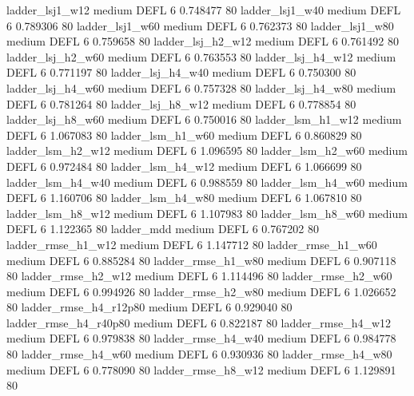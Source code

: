        ladder_lsj1_w12     medium     DEFL                 6 0.748477 80
       ladder_lsj1_w40     medium     DEFL                 6 0.789306 80
       ladder_lsj1_w60     medium     DEFL                 6 0.762373 80
       ladder_lsj1_w80     medium     DEFL                 6 0.759658 80
     ladder_lsj_h2_w12     medium     DEFL                 6 0.761492 80
     ladder_lsj_h2_w60     medium     DEFL                 6 0.763553 80
     ladder_lsj_h4_w12     medium     DEFL                 6 0.771197 80
     ladder_lsj_h4_w40     medium     DEFL                 6 0.750300 80
     ladder_lsj_h4_w60     medium     DEFL                 6 0.757328 80
     ladder_lsj_h4_w80     medium     DEFL                 6 0.781264 80
     ladder_lsj_h8_w12     medium     DEFL                 6 0.778854 80
     ladder_lsj_h8_w60     medium     DEFL                 6 0.750016 80
     ladder_lsm_h1_w12     medium     DEFL                 6 1.067083 80
     ladder_lsm_h1_w60     medium     DEFL                 6 0.860829 80
     ladder_lsm_h2_w12     medium     DEFL                 6 1.096595 80
     ladder_lsm_h2_w60     medium     DEFL                 6 0.972484 80
     ladder_lsm_h4_w12     medium     DEFL                 6 1.066699 80
     ladder_lsm_h4_w40     medium     DEFL                 6 0.988559 80
     ladder_lsm_h4_w60     medium     DEFL                 6 1.160706 80
     ladder_lsm_h4_w80     medium     DEFL                 6 1.067810 80
     ladder_lsm_h8_w12     medium     DEFL                 6 1.107983 80
     ladder_lsm_h8_w60     medium     DEFL                 6 1.122365 80
            ladder_mdd     medium     DEFL                 6 0.767202 80
    ladder_rmse_h1_w12     medium     DEFL                 6 1.147712 80
    ladder_rmse_h1_w60     medium     DEFL                 6 0.885284 80
    ladder_rmse_h1_w80     medium     DEFL                 6 0.907118 80
    ladder_rmse_h2_w12     medium     DEFL                 6 1.114496 80
    ladder_rmse_h2_w60     medium     DEFL                 6 0.994926 80
    ladder_rmse_h2_w80     medium     DEFL                 6 1.026652 80
 ladder_rmse_h4_r12p80     medium     DEFL                 6 0.929040 80
 ladder_rmse_h4_r40p80     medium     DEFL                 6 0.822187 80
    ladder_rmse_h4_w12     medium     DEFL                 6 0.979838 80
    ladder_rmse_h4_w40     medium     DEFL                 6 0.984778 80
    ladder_rmse_h4_w60     medium     DEFL                 6 0.930936 80
    ladder_rmse_h4_w80     medium     DEFL                 6 0.778090 80
    ladder_rmse_h8_w12     medium     DEFL                 6 1.129891 80
